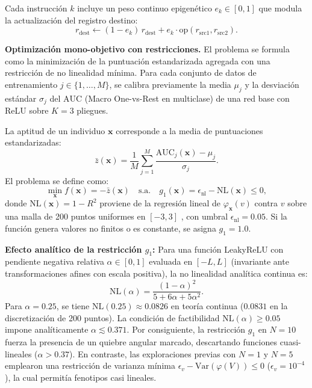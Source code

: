 \documentclass[10pt,twocolumn,letterpaper]{article}
\newcommand{\AUC}{\mathrm{AUC}}
\begin{document}
Cada instrucción $k$ incluye un peso continuo epigenético $e_k \in [0, 1]$ que modula la actualización del registro destino:
\begin{equation}
  r_{\mathrm{dest}} \leftarrow (1 - e_k)\, r_{\mathrm{dest}} + e_k \cdot \mathrm{op}(r_{\mathrm{src1}}, r_{\mathrm{src2}}).
\end{equation}

\textbf{Optimización mono-objetivo con restricciones.} El problema se formula como la minimización de la puntuación estandarizada agregada con una restricción de no linealidad mínima. Para cada conjunto de datos de entrenamiento $j \in \{1, \dots, M\}$, se calibra previamente la media $\mu_j$ y la desviación estándar $\sigma_j$ del $\AUC$ (Macro One-vs-Rest en multiclase) de una red base con ReLU sobre $K=3$ pliegues.

La aptitud de un individuo $\mathbf{x}$ corresponde a la media de puntuaciones estandarizadas:
\begin{equation}
  \bar{z}(\mathbf{x}) = \frac{1}{M}\sum_{j=1}^M \frac{\AUC_j(\mathbf{x}) - \mu_j}{\sigma_j}.
\end{equation}
El problema se define como:
\begin{equation}
  \min_{\mathbf{x}} f(\mathbf{x}) = -\bar{z}(\mathbf{x}) \quad \text{s.a.} \quad g_1(\mathbf{x}) = \epsilon_{\mathrm{nl}} - \mathrm{NL}(\mathbf{x}) \le 0,
\end{equation}
donde $\mathrm{NL}(\mathbf{x}) = 1 - R^2$ proviene de la regresión lineal de $\varphi_{\mathbf{x}}(v)$ contra $v$ sobre una malla de 200 puntos uniformes en $[-3, 3]$ \citep{leshno1993}, con umbral $\epsilon_{\mathrm{nl}} = 0.05$. Si la función genera valores no finitos o es constante, se asigna $g_1 = 1.0$.

\textbf{Efecto analítico de la restricción $g_1$:} Para una función LeakyReLU con pendiente negativa relativa $\alpha \in [0, 1]$ evaluada en $[-L, L]$ (invariante ante transformaciones afines con escala positiva), la no linealidad analítica continua es:
\begin{equation}
  \mathrm{NL}(\alpha) = \frac{(1-\alpha)^2}{5 + 6\alpha + 5\alpha^2}.
\end{equation}
Para $\alpha = 0.25$, se tiene $\mathrm{NL}(0.25) \approx 0.0826$ en teoría continua ($0.0831$ en la discretización de 200 puntos). La condición de factibilidad $\mathrm{NL}(\alpha) \ge 0.05$ impone analíticamente $\alpha \lesssim 0.371$. Por consiguiente, la restricción $g_1$ en $N=10$ fuerza la presencia de un quiebre angular marcado, descartando funciones cuasi-lineales ($\alpha > 0.37$). En contraste, las exploraciones previas con $N=1$ y $N=5$ emplearon una restricción de varianza mínima $\epsilon_v - \mathrm{Var}(\varphi(V)) \le 0$ ($\epsilon_v = 10^{-4}$), la cual permitía fenotipos casi lineales.
\end{document}
